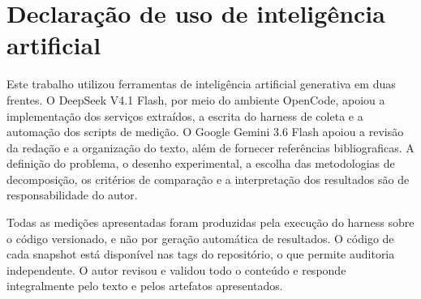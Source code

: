 \chapter*{Declaração de uso de inteligência artificial}

Este trabalho utilizou ferramentas de inteligência artificial generativa em
duas frentes. O DeepSeek V4.1 Flash, por meio do ambiente OpenCode, apoiou a implementação
dos serviços extraídos, a escrita do harness de coleta e a automação dos scripts
de medição. O Google Gemini 3.6 Flash apoiou a revisão da redação e a organização do texto, além de fornecer referências bibliograficas.
A definição do problema, o desenho experimental, a escolha das metodologias de
decomposição, os critérios de comparação e a interpretação dos resultados são de
responsabilidade do autor.

Todas as medições apresentadas foram produzidas pela execução do harness sobre o
código versionado, e não por geração automática de resultados. O código de cada
snapshot está disponível nas tags do repositório, o que permite auditoria
independente. O autor revisou e validou todo o conteúdo e responde integralmente
pelo texto e pelos artefatos apresentados.